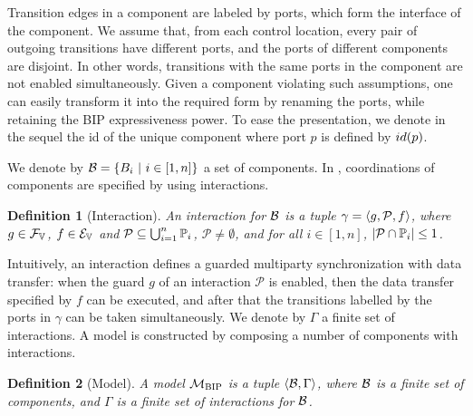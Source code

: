 \documentclass[conference]{IEEEtran}
\newtheorem{definition}{Definition}
\begin{document}
Transition edges in a component are labeled by ports, which form the interface of the component.
We assume that, from each control location,
every pair of outgoing transitions have different ports,
and the ports of different components are disjoint.
In other words, transitions with the same ports in the component are not enabled simultaneously.
Given a component violating such assumptions,
one can easily transform it into the required form by renaming the ports,
while retaining the BIP expressiveness power.
To ease the presentation, we denote in the sequel the id of the unique component
where port $p$ is defined by ${id({p})}$.

%

We denote by $\mathcal{B} = \{B_{i} ~|~ i\in [1,n]\}$ a set of components.
%
In \BIP, coordinations of components are specified by using interactions.

\begin{definition} [Interaction]
	\label{interaction}
	An interaction for $\mathcal{B} $ is a tuple $\gamma = \langle{g, \mathcal{P}, f }\rangle $,
	where $g \in \mathcal{F}_{\mathbb{V}_{}}$, $f\in \mathcal{E}_{\mathbb{V}_{}}$ and
	$\mathcal{P} \subseteq \bigcup_{i=1}^n \mathbb{P}_{i}$, $\mathcal{P} \neq \emptyset$, and
	for all $i \in [1, n]$, $|\mathcal{P} \cap \mathbb{P}_{i}| \le 1$.
\end{definition}

Intuitively, an interaction defines a guarded multiparty synchronization with data transfer:
when the guard $g$ of an interaction $\mathcal{P}$ is enabled,
then the data transfer specified by $f$ can be executed, and
after that the transitions labelled by the ports in $\gamma$ can be taken simultaneously.
%
We denote by $\Gamma$ a finite set of interactions.
A \BIP model is constructed by composing a number of components with interactions.

\begin{definition} [\BIP Model]
	A \BIP model $\mathcal{M}_{\textsc{BIP}}$ is a tuple $\langle{\ensuremath{\mathcal{B}},\Gamma}\rangle$,
	where $\mathcal{B}$ is a finite set of components,
	and $\Gamma$ is a finite set of interactions for $\mathcal{B}$.
\end{definition}
\end{document}
